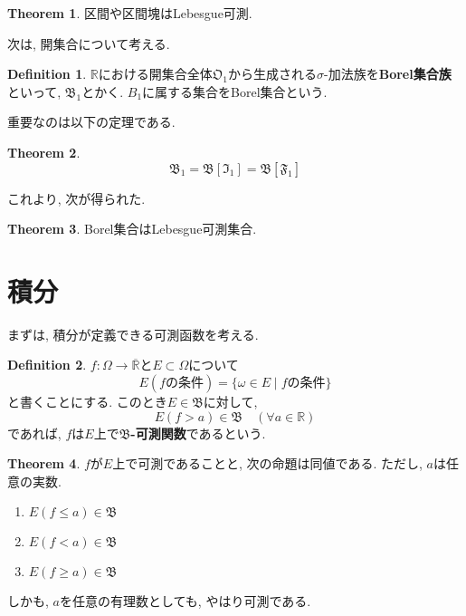 \documentclass[a4j,dvipdfmx]{jsarticle}
\newcommand{\F}{\mathfrak{F}}
\newcommand{\B}{\mathfrak{B}}
\newcommand{\I}{\mathfrak{I}}
\newcommand{\R}{\mathbb{R}}
\theoremstyle{definition}
\newtheorem{definition}{Definition}[section]
\theoremstyle{definition}
\newtheorem{theorem}{Theorem}[section]
\numberwithin{equation}{section}
\begin{document}
            \begin{theorem}
                区間や区間塊はLebesgue可測.
            \end{theorem}

            次は, 開集合について考える.
            \begin{definition}
                $\R$における開集合全体$\mathfrak{O}_1$から生成される$\sigma$-加法族を\textbf{Borel集合族}といって, $\B_1$とかく. $B_1$に属する集合をBorel集合という. 
            \end{definition}

            重要なのは以下の定理である.
            \begin{theorem}
                \begin{equation}
                    \B_1=\B[\I_1]=\B[\F_1]
                \end{equation}
            \end{theorem}

            これより, 次が得られた.
            \begin{theorem}
                Borel集合はLebesgue可測集合.
            \end{theorem}
        \clearpage
        \section{積分}
            まずは, 積分が定義できる可測函数を考える.
            \begin{definition}
                $f:\Omega\to \overline{\R}$と$E\subset \Omega$について
                \begin{equation}
                    E(\text{$f$の条件}) = \{\omega\in E\mid \text{$f$の条件}\}
                \end{equation}
                と書くことにする. このとき$E\in\B$に対して, 
                \begin{equation}
                    E(f>a)\in\B \quad (\forall a\in \R)
                \end{equation}
                であれば, $f$は$E$上で\textbf{$\B$-可測関数}であるという.
            \end{definition}

            \begin{theorem}
                $f$が$E$上で可測であることと, 次の命題は同値である. ただし, $a$は任意の実数.
                \begin{enumerate}\renewcommand{\labelenumi}{(\roman{enumi})}
                    \item $E(f\leq a) \in \B$
                    \item $E(f<a)\in \B$
                    \item $E(f\geq a)\in \B$
                \end{enumerate}

                しかも, $a$を任意の有理数としても, やはり可測である.
            \end{theorem}
\end{document}
